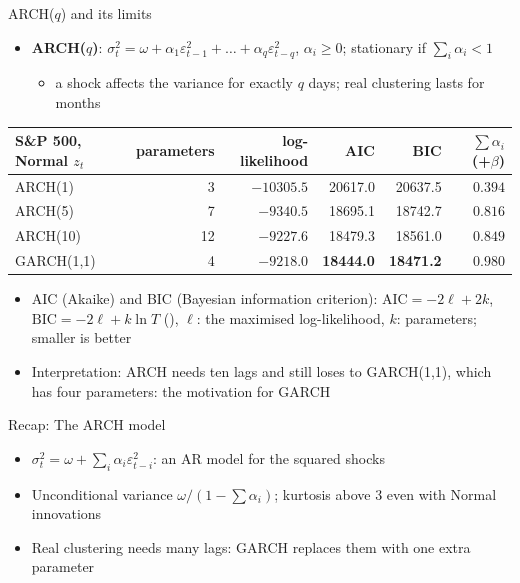 \begin{frame}{ARCH($q$) and its limits}
\itemsize{\footnotesize}
\begin{itemize}
    \item \textbf{ARCH($q$)}: $\sigma_t^2 = \omega + \alpha_1\varepsilon_{t-1}^2 + \dots + \alpha_q\varepsilon_{t-q}^2$, $\alpha_i \ge 0$; stationary if $\sum_i \alpha_i < 1$
    \begin{itemize}
        \item a shock affects the variance for exactly $q$ days; real clustering lasts for months
    \end{itemize}
\end{itemize}\begin{center}
\footnotesize
\begin{tabular}{lrrrrr}
\toprule
S\&P 500, Normal $z_t$ & parameters & log-likelihood & AIC & BIC & $\sum\alpha_i$ (+$\beta$) \\
\midrule
ARCH(1) & 3 & $\ensuremath{-}10305.5$ & 20617.0 & 20637.5 & $0.394$ \\
ARCH(5) & 7 & $\ensuremath{-}9340.5$ & 18695.1 & 18742.7 & $0.816$ \\
ARCH(10) & 12 & $\ensuremath{-}9227.6$ & 18479.3 & 18561.0 & $0.849$ \\
GARCH(1,1) & 4 & $\ensuremath{-}9218.0$ & \textbf{18444.0} & \textbf{18471.2} & $0.980$ \\
\bottomrule
\end{tabular}
\end{center}
\begin{itemize}
    \item \hypertarget{ch5-aicbic}{}AIC (Akaike) and BIC (Bayesian information criterion): $\mathrm{AIC} = -2\ell + 2k$, $\mathrm{BIC} = -2\ell + k\ln T$ (), $\ell$: the maximised log-likelihood, $k$: parameters; smaller is better
    \item Interpretation: ARCH needs ten lags and still loses to GARCH(1,1), which has four parameters: the motivation for GARCH
\end{itemize}
\end{frame}

\begin{frame}{Recap: The ARCH model}
\itemsize{\small}
\begin{itemize}
    \item $\sigma_t^2 = \omega + \sum_i\alpha_i\varepsilon_{t-i}^2$: an AR model for the squared shocks
    \item Unconditional variance $\omega/(1 - \sum\alpha_i)$; kurtosis above 3 even with Normal innovations
    \item Real clustering needs many lags: GARCH replaces them with one extra parameter
\end{itemize}
\end{frame}


